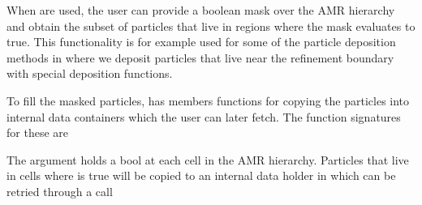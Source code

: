 \documentclass[letterpaper,10pt,english]{sphinxmanual}
\begin{document}
\sphinxAtStartPar
When  are used, the user can provide a boolean mask over the AMR hierarchy and obtain the subset of particles that live in regions where the mask evaluates to true.
This functionality is for example used for some of the particle deposition methods in  where we deposit particles that live near the refinement boundary with special deposition functions.

\sphinxAtStartPar
To fill the masked particles,  has members functions for copying the particles into internal data containers which the user can later fetch.
The function signatures for these are

\begin{sphinxVerbatim}[commandchars=\\\{\},formatcom=\scriptsize]
      

  
    

  
    
\end{sphinxVerbatim}

\sphinxAtStartPar
The argument  holds a bool at each cell in the AMR hierarchy.
Particles that live in cells where  is true will be copied to an internal data holder in  which can be retried through a call

\begin{sphinxVerbatim}[commandchars=\\\{\},formatcom=\scriptsize]
   
\end{sphinxVerbatim}
\end{document}
